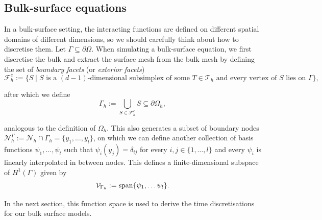 \subsection{Bulk-surface equations}

In a bulk-surface setting, the interacting functions are defined on different spatial domains of different dimensions, so we should carefully think about how to discretise them. Let $\Gamma \subseteq \partial \Omega$. When simulating a bulk-surface equation, we first discretise the bulk and extract the surface mesh from the bulk mesh by defining the set of \emph{boundary facets} (or \emph{exterior facets})
%
\begin{equation*}
    \mathcal{F}_h^e := \{ S \mid S \text{ is a $(d-1)$-dimensional subsimplex of some } T \in \mathcal{T}_h \text{ and every vertex of $S$ lies on } \Gamma\},
\end{equation*}

\noindent
after which we define
%
\begin{equation*}
    \Gamma_h := \bigcup_{S \in \mathcal{F}_h^e} S \subseteq \partial \Omega_h,
\end{equation*}

\noindent
analogous to the definition of $\Omega_h$. This also generates a subset of boundary nodes $\mathcal{N}_h^\Gamma := \mathcal{N}_h \cap \Gamma_h = \{ y_1, \dots, y_l \}$, on which we can define another collection of basis functions $\psi_1, \dots, \psi_l$ such that $\psi_i (y_j) = \delta_{ij}$ for every $i,j \in \{ 1, \dots, l \}$ and every $\psi_i$ is linearly interpolated in between nodes. This defines a finite-dimensional subspace of $H^1(\Gamma)$ given by
%
\begin{equation*}
    \mathcal{V}_{\Gamma_h} := \operatorname*{span} \{ \psi_1, \dots \psi_l \}.
\end{equation*}

\noindent
In the next section, this function space is used to derive the time discretisations for our bulk surface models.